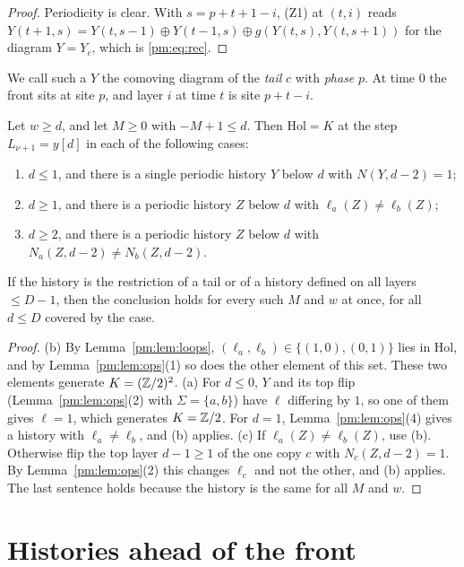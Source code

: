 \begin{proof}
Periodicity is clear. With $s=p+t+1-i$, (Z1) at $(t,i)$ reads $Y(t+1,s)=Y(t,s-1)\oplus Y(t-1,s)\oplus g(Y(t,s),Y(t,s+1))$ for the diagram $Y=Y_c$, which is \eqref{pm:eq:rec}.
\end{proof}

We call such a $Y$ the comoving diagram of the \emph{tail} $c$ with \emph{phase} $p$. At time $0$ the front sits at site $p$, and layer $i$ at time $t$ is site $p+t-i$.

\begin{corollary}\label{pm:cor:crit}
Let $w\ge d$, and let $M\ge0$ with $-M+1\le d$. Then $\mathrm{Hol}=K$ at the step $L_{\nu+1}=y[d]$ in each of the following cases:
\begin{enumerate}
\item[(a)] $d\le1$, and there is a single periodic history $Y$ below $d$ with $N(Y,d-2)=1$;
\item[(b)] $d\ge1$, and there is a periodic history $Z$ below $d$ with $\ell_a(Z)\ne\ell_b(Z)$;
\item[(c)] $d\ge2$, and there is a periodic history $Z$ below $d$ with $N_a(Z,d-2)\ne N_b(Z,d-2)$.
\end{enumerate}
If the history is the restriction of a tail or of a history defined on all layers $\le D-1$, then the conclusion holds for every such $M$ and $w$ at once, for all $d\le D$ covered by the case.
\end{corollary}

\begin{proof}
(b) By Lemma~\ref{pm:lem:loops}, $(\ell_a,\ell_b)\in\{(1,0),(0,1)\}$ lies in $\mathrm{Hol}$, and by Lemma~\ref{pm:lem:ops}(1) so does the other element of this set. These two elements generate $K=(\mathbb{Z}/2)^2$. (a) For $d\le0$, $Y$ and its top flip (Lemma~\ref{pm:lem:ops}(2) with $\Sigma=\{a,b\}$) have $\ell$ differing by $1$, so one of them gives $\ell=1$, which generates $K=\mathbb{Z}/2$. For $d=1$, Lemma~\ref{pm:lem:ops}(4) gives a history with $\ell_a\ne\ell_b$, and (b) applies. (c) If $\ell_a(Z)\ne\ell_b(Z)$, use (b). Otherwise flip the top layer $d-1\ge1$ of the one copy $c$ with $N_c(Z,d-2)=1$. By Lemma~\ref{pm:lem:ops}(2) this changes $\ell_c$ and not the other, and (b) applies. The last sentence holds because the history is the same for all $M$ and $w$.
\end{proof}

\section{Histories ahead of the front}\label{pm:sec:loops}

